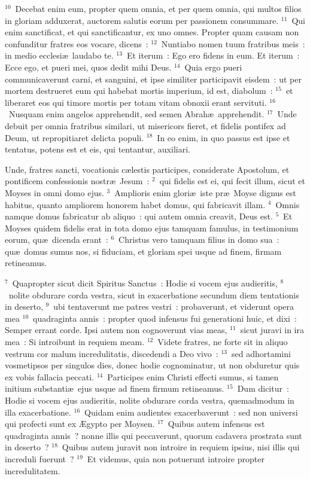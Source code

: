 ${}^{10}$~Decebat enim eum, propter quem omnia, et per quem omnia, qui multos filios in gloriam adduxerat, auctorem salutis eorum per passionem consummare.
${}^{11}$~Qui enim sanctificat, et qui sanctificantur, ex uno omnes. Propter quam causam non confunditur fratres eos vocare, dicens~:
${}^{12}$~Nuntiabo nomen tuum fratribus meis~: in medio ecclesi\ae\ laudabo te.
${}^{13}$~Et iterum~: Ego ero fidens in eum. Et iterum~: Ecce ego, et pueri mei, quos dedit mihi Deus.
${}^{14}$~Quia ergo pueri communicaverunt carni, et sanguini, et ipse similiter participavit eisdem~: ut per mortem destrueret eum qui habebat mortis imperium, id est, diabolum~:
${}^{15}$~et liberaret eos qui timore mortis per totam vitam obnoxii erant servituti.
${}^{16}$~Nusquam enim angelos apprehendit, sed semen Abrah\ae\ apprehendit.
${}^{17}$~Unde debuit per omnia fratribus similari, ut misericors fieret, et fidelis pontifex ad Deum, ut repropitiaret delicta populi.
${}^{18}$~In eo enim, in quo passus est ipse et tentatus, potens est et eis, qui tentantur, auxiliari.

\lettrine[lines=3,image=true,loversize=0.05,lraise=-0.03]{U}{}nde, fratres sancti, vocationis c\ae lestis participes, considerate Apostolum, et pontificem confessionis nostr\ae\ Jesum~:
${}^{2}$~qui fidelis est ei, qui fecit illum, sicut et Moyses in omni domo ejus.
${}^{3}$~Amplioris enim glori\ae\ iste pr\ae\ Moyse dignus est habitus, quanto ampliorem honorem habet domus, qui fabricavit illam.
${}^{4}$~Omnis namque domus fabricatur ab aliquo~: qui autem omnia creavit, Deus est.
${}^{5}$~Et Moyses quidem fidelis erat in tota domo ejus tamquam famulus, in testimonium eorum, qu\ae\ dicenda erant~:
${}^{6}$~Christus vero tamquam filius in domo sua~: qu\ae\ domus sumus nos, si fiduciam, et gloriam spei usque ad finem, firmam retineamus.


${}^{7}$~Quapropter sicut dicit Spiritus Sanctus~: Hodie si vocem ejus audieritis,
${}^{8}$~nolite obdurare corda vestra, sicut in exacerbatione secundum diem tentationis in deserto,
${}^{9}$~ubi tentaverunt me patres vestri~: probaverunt, et viderunt opera mea
${}^{10}$~quadraginta annis~: propter quod infensus fui generationi huic, et dixi~: Semper errant corde. Ipsi autem non cognoverunt vias meas,
${}^{11}$~sicut juravi in ira mea~: Si introibunt in requiem meam.
${}^{12}$~Videte fratres, ne forte sit in aliquo vestrum cor malum incredulitatis, discedendi a Deo vivo~:
${}^{13}$~sed adhortamini vosmetipsos per singulos dies, donec hodie cognominatur, ut non obduretur quis ex vobis fallacia peccati.
${}^{14}$~Participes enim Christi effecti sumus, si tamen initium substanti\ae\ ejus usque ad finem firmum retineamus.
${}^{15}$~Dum dicitur~: Hodie si vocem ejus audieritis, nolite obdurare corda vestra, quemadmodum in illa exacerbatione.
${}^{16}$~Quidam enim audientes exacerbaverunt~: sed non universi qui profecti sunt ex \AE gypto per Moysen.
${}^{17}$~Quibus autem infensus est quadraginta annis~? nonne illis qui peccaverunt, quorum cadavera prostrata sunt in deserto~?
${}^{18}$~Quibus autem juravit non introire in requiem ipsius, nisi illis qui increduli fuerunt~?
${}^{19}$~Et videmus, quia non potuerunt introire propter incredulitatem.

